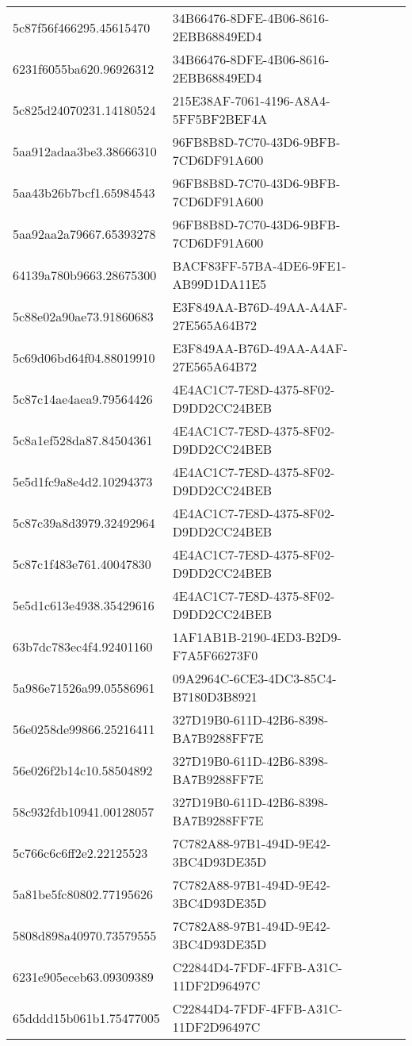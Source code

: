 \begin{tabular}{ll}
5c87f56f466295.45615470 & 34B66476-8DFE-4B06-8616-2EBB68849ED4 \\
6231f6055ba620.96926312 & 34B66476-8DFE-4B06-8616-2EBB68849ED4 \\
5c825d24070231.14180524 & 215E38AF-7061-4196-A8A4-5FF5BF2BEF4A \\
5aa912adaa3be3.38666310 & 96FB8B8D-7C70-43D6-9BFB-7CD6DF91A600 \\
5aa43b26b7bcf1.65984543 & 96FB8B8D-7C70-43D6-9BFB-7CD6DF91A600 \\
5aa92aa2a79667.65393278 & 96FB8B8D-7C70-43D6-9BFB-7CD6DF91A600 \\
64139a780b9663.28675300 & BACF83FF-57BA-4DE6-9FE1-AB99D1DA11E5 \\
5c88e02a90ae73.91860683 & E3F849AA-B76D-49AA-A4AF-27E565A64B72 \\
5c69d06bd64f04.88019910 & E3F849AA-B76D-49AA-A4AF-27E565A64B72 \\
5c87c14ae4aea9.79564426 & 4E4AC1C7-7E8D-4375-8F02-D9DD2CC24BEB \\
5c8a1ef528da87.84504361 & 4E4AC1C7-7E8D-4375-8F02-D9DD2CC24BEB \\
5e5d1fc9a8e4d2.10294373 & 4E4AC1C7-7E8D-4375-8F02-D9DD2CC24BEB \\
5c87c39a8d3979.32492964 & 4E4AC1C7-7E8D-4375-8F02-D9DD2CC24BEB \\
5c87c1f483e761.40047830 & 4E4AC1C7-7E8D-4375-8F02-D9DD2CC24BEB \\
5e5d1c613e4938.35429616 & 4E4AC1C7-7E8D-4375-8F02-D9DD2CC24BEB \\
63b7dc783ec4f4.92401160 & 1AF1AB1B-2190-4ED3-B2D9-F7A5F66273F0 \\
5a986e71526a99.05586961 & 09A2964C-6CE3-4DC3-85C4-B7180D3B8921 \\
56e0258de99866.25216411 & 327D19B0-611D-42B6-8398-BA7B9288FF7E \\
56e026f2b14c10.58504892 & 327D19B0-611D-42B6-8398-BA7B9288FF7E \\
58c932fdb10941.00128057 & 327D19B0-611D-42B6-8398-BA7B9288FF7E \\
5c766c6c6ff2e2.22125523 & 7C782A88-97B1-494D-9E42-3BC4D93DE35D \\
5a81be5fc80802.77195626 & 7C782A88-97B1-494D-9E42-3BC4D93DE35D \\
5808d898a40970.73579555 & 7C782A88-97B1-494D-9E42-3BC4D93DE35D \\
6231e905eceb63.09309389 & C22844D4-7FDF-4FFB-A31C-11DF2D96497C \\
65dddd15b061b1.75477005 & C22844D4-7FDF-4FFB-A31C-11DF2D96497C \\

\end{tabular}
